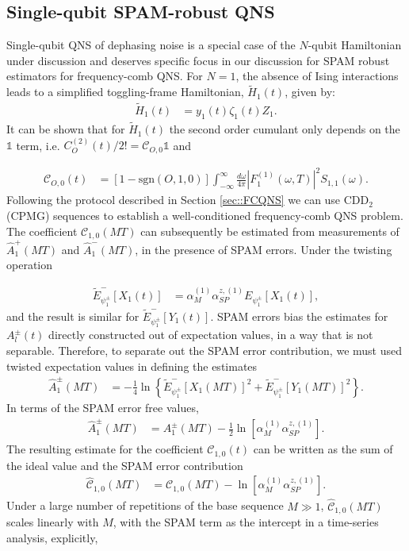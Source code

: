 \documentclass[%
 reprint,
superscriptaddress,
 amsmath,amssymb,
 aps,
pra,
floatfix,
]{revtex4-2}
\begin{document}
\smallskip

\subsection{Single-qubit SPAM-robust QNS}

Single-qubit QNS of dephasing noise is a special case of the $N$-qubit Hamiltonian under discussion and deserves specific focus in our discussion for SPAM robust estimators for frequency-comb QNS. For $N=1$, the absence of Ising interactions leads to a simplified toggling-frame Hamiltonian, $\tilde{H}_1(t)$, given by:
\begin{align}
    \tilde{H}_1(t)&=y_{1}(t)\zeta_1(t)Z_1.
\end{align}
It can be shown that for $\tilde{H}_1(t)$ the second order cumulant only depends on the $\mathbb{1}$ term, i.e. $C_O^{(2)}(t)/2!=\mathcal{C}_{O,0}\mathbb{1}$ \cite{PhysRevLett.107.230501} and

\begin{align}
    \mathcal{C}_{O,0}(t)&=\left[1-\text{sgn}(O,1,0)\right]\int_{-\infty}^\infty\frac{d\omega}{4\pi}\left|F_{1}^{(1)}(\omega,T)\right|^2S_{1,1}(\omega).
\end{align}
Following the protocol described in Section \ref{sec::FCQNS} we can use $\text{CDD}_2$ (CPMG) sequences to establish a well-conditioned frequency-comb QNS problem. The coefficient $\mathcal{C}_{1,0}(MT)$ can subsequently be estimated from measurements of $\hat{A}_1^+(MT)$ and $\hat{A}_1^-(MT)$, in the presence of SPAM errors. Under the twisting operation

\begin{align}
    \tilde{E}^-_{\psi^\pm_1}[X_1(t)]&=\alpha_M^{(1)}\alpha_{SP}^{z,(1)}E_{\psi^\pm_1}[X_1(t)],
\end{align}
and the result is similar for $\tilde{E}^-_{\psi^\pm_1}[Y_1(t)]$. SPAM errors bias the estimates for $A^\pm_l(t)$ directly constructed out of expectation values, in a way that is not separable. Therefore, to separate out the SPAM error contribution, we must used twisted expectation values in defining the estimates
\begin{align}
    \hat{A}^\pm_1(MT)&=-\frac{1}{4}\ln\left\{\tilde{E}^-_{\psi^\pm_1}[X_1(MT)]^2+\tilde{E}^-_{\psi^\pm_1}[Y_1(MT)]^2\right\}.
\end{align}
In terms of the SPAM error free values,
\begin{align}
    \hat{A}^\pm_1(MT)&=A^\pm_1(MT)-\frac{1}{2}\ln\left[\alpha_M^{(1)}\alpha_{SP}^{z,(1)}\right].
\end{align}
The resulting estimate for the coefficient $\mathcal{C}_{1,0}(t)$ can be written as the sum of the ideal value and the SPAM error contribution
\begin{align}
    \hat{\mathcal{C}}_{1,0}(MT)&=\mathcal{C}_{1,0}(MT)-\ln\left[\alpha_M^{(1)}\alpha_{SP}^{z,(1)}\right].
\end{align}
Under a large number of repetitions of the base sequence $M\gg1$, $\hat{\mathcal{C}}_{1,0}(MT)$ scales linearly with $M$, with the SPAM term as the intercept in a time-series analysis, explicitly,
\end{document}
